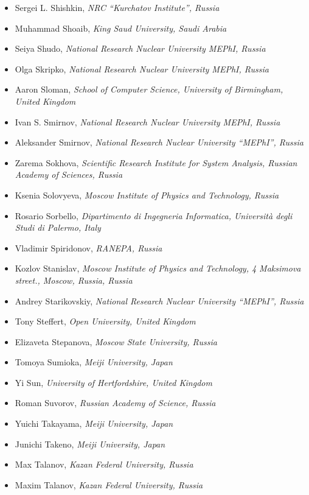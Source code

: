 \documentclass[10pt,fleqn,openany]{book} %
\begin{document}
\begin{itemize}
		\item Sergei L. Shishkin, \textit{NRC ``Kurchatov Institute'', Russia}
		\item Muhammad Shoaib, \textit{King Saud University, Saudi Arabia}
		\item Seiya Shudo, \textit{National Research Nuclear University MEPhI, Russia}
		\item Olga Skripko, \textit{National Research Nuclear University MEPhI, Russia}
		\item Aaron Sloman, \textit{School of Computer Science, University of Birmingham, United Kingdom}
		\item Ivan S. Smirnov, \textit{National Research Nuclear University MEPhI, Russia}
		\item Aleksander Smirnov, \textit{National Research Nuclear University ``MEPhI'', Russia}
		\item Zarema Sokhova, \textit{Scientific Research Institute for System Analysis, Russian Academy of Sciences, Russia}
		\item Ksenia Solovyeva, \textit{Moscow Institute of Physics and Technology, Russia}
		\item Rosario Sorbello, \textit{Dipartimento di Ingegneria Informatica, Università degli Studi di Palermo, Italy}
		\item Vladimir Spiridonov, \textit{RANEPA, Russia}
		\item Kozlov Stanislav, \textit{Moscow Institute of Physics and Technology, 4 Maksimova street., Moscow, Russia, Russia}
		\item Andrey Starikovskiy, \textit{National Research Nuclear University ``MEPhI'', Russia}
		\item Tony Steffert, \textit{Open University, United Kingdom}
		\item Elizaveta Stepanova, \textit{Moscow State University, Russia}
		\item Tomoya Sumioka, \textit{Meiji University, Japan}
		\item Yi Sun, \textit{University of Hertfordshire, United Kingdom}
		\item Roman Suvorov, \textit{Russian Academy of Science, Russia}
		\item Yuichi Takayama, \textit{Meiji University, Japan}
		\item Junichi Takeno, \textit{Meiji University, Japan}
		\item Max Talanov, \textit{Kazan Federal University, Russia}
		\item Maxim Talanov, \textit{Kazan Federal University, Russia}

\end{itemize}
\end{document}

